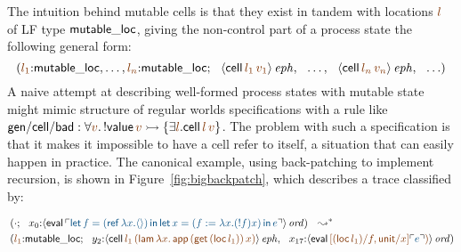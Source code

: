 The intuition behind mutable cells is that they exist in 
tandem with locations $\lf{l}$ of LF type ${\sf mutable\_loc}$,
giving the non-control part of a process state the following
general form:
\[\left(\lf{l_1}{:}{\sf mutable\_loc},\ldots,\lf{l_n}{:}{\sf mutable\_loc};
  ~~ \iseph{\susp{{\sf cell}\,\lf{l_1}\,\lf{v_1}}}, 
  ~~ \ldots, 
  ~~ \iseph{\susp{{\sf cell}\,\lf{l_n}\,\lf{v_n}}}, 
  ~~ \ldots\right)\]
%
A naive attempt at describing well-formed process states with mutable
state might mimic structure of regular worlds specifications with a
rule like ${\sf gen/cell/bad} : \forall \lf{v}.\, {!}{\sf value}\,\lf{v}
\lefti \{ \exists \lf{l}. {\sf cell}\,\lf{l}\,\lf{v} \}$. The problem
with such a specification is that it makes it impossible to have a
cell refer to itself, a situation that can easily happen in
practice. The canonical example, using back-patching to implement
recursion, is shown in Figure~\ref{fig:bigbackpatch}, which describes a
trace classified by:

{\small\begin{align*}
&
\left(\cdot; ~~
 x_0{:}\istrue{\susp{{\sf eval}\,
  \interp{{\sf let}\,f = ({\sf ref}\,\lambda x. \langle\rangle) \,{\sf in}\,
          {\sf let}\,x = (f := \lambda x. ({!}f) x)\,{\sf in}\,e}}}
\right) ~~ \leadsto^*
\\
& 
\left(
\lf{l_1}{:}{\sf mutable\_loc}; ~~
y_2{:}\iseph{\susp{{\sf cell}\,\lf{l_1}\,
  \lf{({\sf lam}\,\lambda x.\,{\sf app}\,({\sf get}\,({\sf loc}\,l_1))\,x)}}},
 ~~
x_{17}{:}\istrue{\susp{{\sf eval}\,
  \lf{[({\sf loc}\,l_1)/f, {\sf unit}/x]\interp{e})}}}
\right)
\end{align*}}

